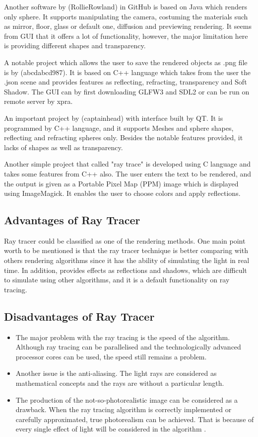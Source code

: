 \documentclass{article}
\begin{document}
Another software by (RollieRowland) in GitHub is based on Java which renders only sphere. It supports manipulating the camera, costuming the materials such as mirror, floor, glass or default one, diffusion and previewing rendering. It seems from GUI that it offers a lot of functionality, however, the major limitation here is providing different shapes and transparency. \cite{8}

A notable project which allows the user to save the rendered objects as .png file is by (abcdabcd987). It is based on C++ language which takes from the user the .json scene and provides features as reflecting, refracting, transparency and Soft Shadow. The GUI can by first downloading GLFW3 and SDL2 or can be run on remote server by xpra. \cite{9}

An important project by (captainhead) with interface built by QT. It is programmed by C++ language, and it supports Meshes and sphere shapes, reflecting and refracting spheres only. Besides the notable features provided, it lacks of shapes as well as transparency. \cite{10}

Another simple project that called "ray trace" is developed using C language and takes some features from C++ also.  The user enters the text to be rendered, and the output is given as a Portable Pixel Map (PPM) image which is displayed using ImageMagick. It enables the user to choose colors and apply reflections. \cite{15}

\subsection{Advantages of Ray Tracer}

Ray tracer could be classified as one of the rendering methods. One main point worth to be mentioned is that the ray tracer technique is better comparing with others rendering algorithms since it has the ability of simulating the light in real time. In addition, provides effects as reflections and shadows, which are difficult to simulate using other algorithms, and it is a default functionality on ray tracing. \cite{13}




\subsection{Disadvantages of Ray Tracer}
\begin{itemize}
    \item The major problem with the ray tracing is the speed of the algorithm. Although ray tracing can be parallelised and the technologically advanced processor cores can be used, the speed still remains a problem. \cite{14}  
\item	Another issue is the anti-aliasing. The light rays are considered as mathematical concepts and the rays are without a particular length. \cite{14}
\item	The production of the not-so-photorealistic image can be considered as a drawback. When the ray tracing algorithm is correctly implemented or carefully approximated, true photorealism can be achieved. That is because of every single effect of light will be considered in the algorithm \cite{13}.
\end{itemize}
\end{document}
